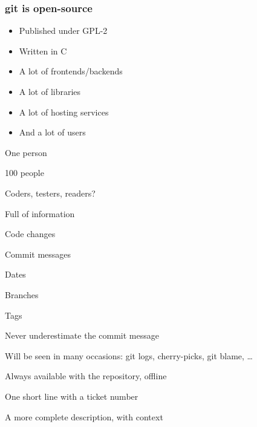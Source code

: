 \begin{frame}
    \frametitle{git is open-source}
    \begin{itemize}
        \item Published under GPL-2\pause
        \item Written in C\pause
        \item A lot of frontends/backends
        \item A lot of libraries
        \item A lot of hosting services
        \item And a lot of users
    \end{itemize}
\end{frame}


\begin{iframe}[A team]
\item One person
\item 100 people
\item Coders, testers, readers?
\end{iframe}

\begin{iframe}
\item Full of information
\item Code changes
\item Commit messages
\item Dates
\item Branches
\item Tags
\end{iframe}




\begin{iframe}
\item Never underestimate the commit message
\item Will be seen in many occasions: git logs, cherry-picks, git blame, \dots
\item Always available with the repository, offline
\end{iframe}

\begin{iframe}[Format]
\item One short line with a ticket number
\item <blank line>
\item A more complete description, with context
\end{iframe}


